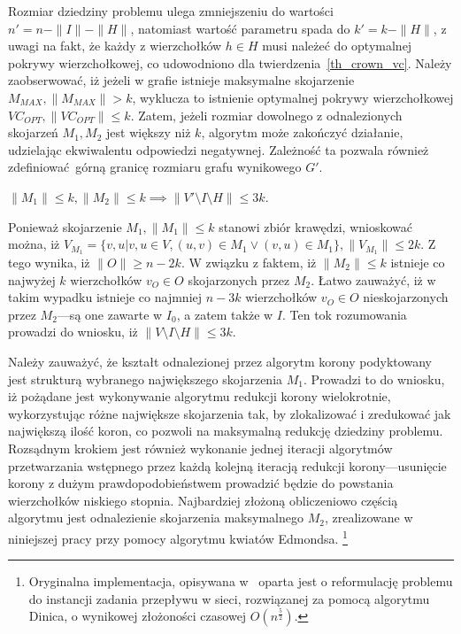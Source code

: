 Rozmiar dziedziny problemu ulega zmniejszeniu do wartości
$n\prime=n-\|I\|-\|H\|$, natomiast wartość parametru spada do $k\prime=k-\|H\|$,
z uwagi na fakt, że każdy z wierzchołków $h \in H$ musi należeć do optymalnej
pokrywy wierzchołkowej, co udowodniono dla twierdzenia~\ref{th_crown_vc}.
Należy zaobserwować, iż jeżeli w grafie istnieje maksymalne skojarzenie
$M_{MAX}, \|M_{MAX}\| > k$, wyklucza to istnienie optymalnej pokrywy
wierzchołkowej $VC_{OPT}, \|VC_{OPT}\|\leq k$. Zatem, jeżeli rozmiar dowolnego 
z odnalezionych skojarzeń $M_1, M_2$  jest większy niż $k$, algorytm może
zakończyć działanie, udzielając ekwiwalentu odpowiedzi negatywnej.
Zależność ta pozwala również zdefiniować górną granicę rozmiaru grafu wynikowego
$G\prime$.

\begin{theorem}
  $\|M_1\| \leq k, \|M_2\| \leq k \implies \|V\prime \setminus I \setminus H\|
  \leq 3k$.
\end{theorem}
\begin{bproof}
  Ponieważ skojarzenie $M_1, \|M_1\| \leq k$ stanowi zbiór krawędzi, wnioskować
  można, iż $V_{M_1}=\{v, u|v, u \in V, (u,v)\in M_1 \lor (v,u) \in M_1\}, \|V_{M_1}\| \leq
  2k$.
  Z tego wynika, iż $\|O\| \geq n-2k$.
  W związku z faktem, iż $\|M_2\| \leq k$ istnieje co najwyżej $k$ wierzchołków
  $v_O \in O$ skojarzonych przez $M_2$.
  Łatwo zauważyć, iż w takim wypadku istnieje co najmniej $n-3k$ wierzchołków
  $v_O \in O$ nieskojarzonych przez $M_2$---są one zawarte w $I_0$, a zatem
  także w $I$.
  Ten tok rozumowania prowadzi do wniosku, iż $\|V \setminus I \setminus H\|
  \leq 3k$.
\end{bproof}

Należy zauważyć, że kształt odnalezionej przez algorytm korony podyktowany jest
strukturą wybranego największego skojarzenia $M_1$.
Prowadzi to do wniosku, iż pożądane jest wykonywanie algorytmu redukcji korony
wielokrotnie, wykorzystując różne największe skojarzenia tak, by zlokalizować i
zredukować jak największą ilość koron, co pozwoli na maksymalną redukcję
dziedziny problemu.
Rozsądnym krokiem jest również wykonanie jednej iteracji algorytmów przetwarzania
wstępnego przez każdą kolejną iteracją redukcji korony---usunięcie korony z
dużym prawdopodobieństwem prowadzić będzie do powstania wierzchołków niskiego
stopnia.
Najbardziej złożoną obliczeniowo częścią algorytmu jest odnalezienie skojarzenia
maksymalnego $M_2$, zrealizowane w niniejszej pracy przy pomocy algorytmu
kwiatów Edmondsa.
\footnote{
  Oryginalna implementacja, opisywana
  w~\cite{KernelizationAlgorithms04} oparta jest o reformulację problemu do
  instancji zadania przepływu w sieci, rozwiązanej za pomocą algorytmu Dinica, o
  wynikowej złożoności czasowej $O(n^{\frac{5}{2}})$.
}

